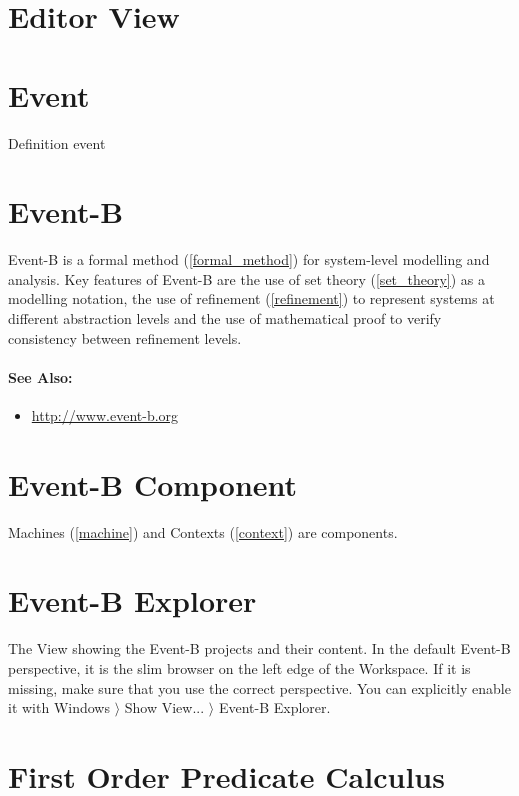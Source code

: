 \section{Editor View}
\label{editor_view}


\section{Event}
\label{event}

Definition event

\section{Event-B}
\label{eventb}

Event-B is a formal method (\ref{formal_method}) for system-level modelling and analysis. Key features of Event-B are the use of set theory (\ref{set_theory}) as a modelling notation, the use of refinement (\ref{refinement}) to represent systems at different abstraction levels and the use of mathematical proof to verify consistency between refinement levels.

\paragraph{See Also:}
\begin{itemize}
\item \url{http://www.event-b.org}
\end{itemize}

\section{Event-B Component}
\label{eventb_component}

Machines (\ref{machine}) and Contexts (\ref{context}) are components.

\section{Event-B Explorer}
\label{eventb_explorer}

The View showing the Event-B projects and their content.  In the default Event-B perspective, it is the slim browser on the left edge of the Workspace.  If it is missing, make sure that you use the correct perspective.  You can explicitly enable it with \textsf{Windows $\rangle$ Show View... $\rangle$ Event-B Explorer}.

\section{First Order Predicate Calculus}
\label{first_order_predicate_calculus}


